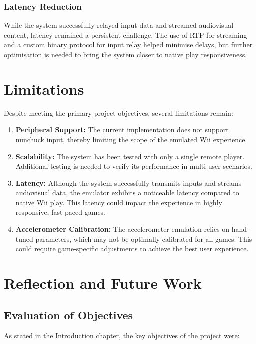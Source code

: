 \subsubsection{Latency Reduction}
While the system successfully relayed input data and streamed audiovisual content, latency remained a persistent challenge. The use of RTP for streaming and a custom binary protocol for input relay helped minimise delays, but further optimisation is needed to bring the system closer to native play responsiveness.

\section{Limitations}

Despite meeting the primary project objectives, several limitations remain:

\begin{enumerate}
    \item \textbf{Peripheral Support:}
          The current implementation does not support nunchuck input, thereby limiting the scope of the emulated Wii experience.
    \item \textbf{Scalability:}
          The system has been tested with only a single remote player. Additional testing is needed to verify its performance in multi-user scenarios.
    \item \textbf{Latency:}
          Although the system successfully transmits inputs and streams audiovisual data, the emulator exhibits a noticeable latency compared to native Wii play. This latency could impact the experience in highly responsive, fast-paced games.
    \item \textbf{Accelerometer Calibration:}
          The accelerometer emulation relies on hand-tuned parameters, which may not be optimally calibrated for all games. This could require game-specific adjustments to achieve the best user experience.
\end{enumerate}

\section{Reflection and Future Work}

\subsection*{Evaluation of Objectives}
As stated in the \hyperlink{chapter:introduction}{Introduction} chapter, the key objectives of the project were:


